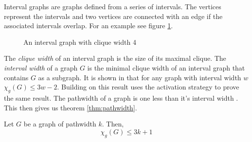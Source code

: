 Interval graphs are graphs defined from a series of intervals. The vertices represent the intervals and two vertices are connected with an edge if the associated intervals overlap. For an example see figure \ref{fig:intvGraph}.
%
\begin{figure}[h]
    \centering
    \caption{An interval graph with clique width 4}
    \label{fig:intvGraph}
\end{figure}
%
The \textit{clique width} of an interval graph is the size of its maximal clique. The \textit{interval width} of a graph $G$ is the minimal clique width of an interval graph that contains $G$ as a subgraph. It is shown in \cite{faKeKiTr1993} that for any graph with interval width $w$ $\chi_g(G)\leq 3w - 2$. Building on this result \cite{KIERSTEAD2000} uses the activation strategy to prove the same result. The pathwidth of a graph is one less than it's interval width \cite{Bodlaender1998}. This then gives us theorem \ref{thm:pathwidth}. 

\begin{theorem}\label{thm:pathwidth}
    Let $G$ be a graph of pathwidth $k$. Then, 
    \[\chi_g(G) \leq 3k + 1\]    
\end{theorem}

